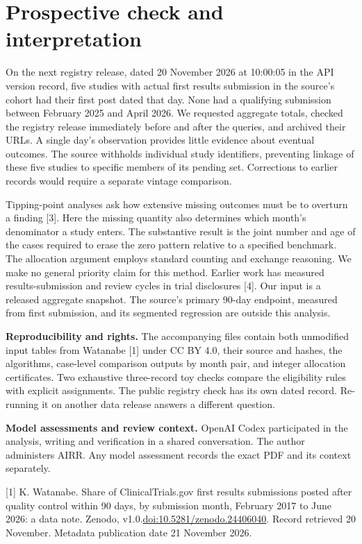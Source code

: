 \documentclass[11pt]{article}
\begin{document}
\newpage
\section{Prospective check and interpretation}
On the next registry release, dated 20 November 2026 at 10:00:05 in the API version record, five studies with actual first results submission in the source's cohort had their first post dated that day. None had a qualifying submission between February 2025 and April 2026. We requested aggregate totals, checked the registry release immediately before and after the queries, and archived their URLs. A single day's observation provides little evidence about eventual outcomes. The source withholds individual study identifiers, preventing linkage of these five studies to specific members of its pending set. Corrections to earlier records would require a separate vintage comparison.

Tipping-point analyses ask how extensive missing outcomes must be to overturn a finding [3]. Here the missing quantity also determines which month's denominator a study enters. The substantive result is the joint number and age of the cases required to erase the zero pattern relative to a specified benchmark. The allocation argument employs standard counting and exchange reasoning. We make no general priority claim for this method. Earlier work has measured results-submission and review cycles in trial disclosures [4]. Our input is a released aggregate snapshot. The source's primary 90-day endpoint, measured from first submission, and its segmented regression are outside this analysis.

\textbf{Reproducibility and rights.} The accompanying files contain both unmodified input tables from Watanabe [1] under CC BY 4.0, their source and hashes, the algorithms, case-level comparison outputs by month pair, and integer allocation certificates. Two exhaustive three-record toy checks compare the eligibility rules with explicit assignments. The public registry check has its own dated record. Re-running it on another data release answers a different question.

\textbf{Model assessments and review context.} OpenAI Codex participated in the analysis, writing and verification in a shared conversation. The author administers AIRR. Any model assessment records the exact PDF and its context separately.

\small
[1] K. Watanabe. Share of ClinicalTrials.gov first results submissions posted after quality control within 90 days, by submission month, February 2017 to June 2026: a data note. Zenodo, v1.0.\newline \href{https://doi.org/10.5281/zenodo.24406040}{doi:10.5281/zenodo.24406040}. Record retrieved 20 November. Metadata publication date 21 November 2026.
\end{document}
